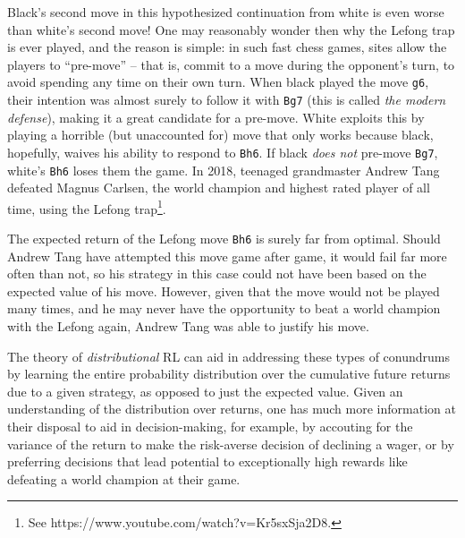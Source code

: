 \begin{center}
  \begin{minipage}{0.48\linewidth}
    \centering

    \showboard
  \end{minipage}
  \begin{minipage}{0.48\linewidth}
    \centering

    \showboard
  \end{minipage}
\end{center}

Black's second move in this hypothesized continuation from white is
even worse than white's second move! One may reasonably wonder then
why the Lefong trap is ever played, and the reason is simple: in such fast
chess games, sites allow the players to ``pre-move'' -- that is,
commit to a move during the opponent's turn, to avoid spending any
time on their own turn. When black played the move \texttt{g6}, their
intention was almost surely to follow it with \texttt{Bg7} (this is
called \emph{the modern defense}), making it a great candidate for a
pre-move. White exploits this by playing a horrible (but unaccounted
for) move that only works because black, hopefully, waives his ability
to respond to \texttt{Bh6}. If black \emph{does not} pre-move
\texttt{Bg7}, white's \texttt{Bh6} loses them the game. In 2018,
teenaged grandmaster Andrew Tang defeated Magnus Carlsen, the world
champion and highest rated player of all time, using the Lefong
trap\footnote{See https://www.youtube.com/watch?v=Kr5sxSja2D8.}.

The expected return of the Lefong move \texttt{Bh6} is
surely far from optimal. Should Andrew Tang have attempted this
move game after game, it would fail far more often than not, so his
strategy in this case could not have been based on the expected value
of his move. However, given that the move would not be played many
times, and he may never have the opportunity to beat a world champion
with the Lefong again, Andrew Tang was able to justify his move.

The theory of \emph{distributional} RL can aid in addressing these
types of conundrums by learning the entire probability distribution over the
cumulative future returns due to a given strategy, as opposed to just
the expected value. Given an understanding of the distribution over
returns, one has much more information at their disposal to aid in decision-making, for
example, by accouting for the variance of the return to make the
risk-averse decision of declining a wager, or by
preferring decisions that lead potential to exceptionally high
rewards like defeating a world champion at their game.

